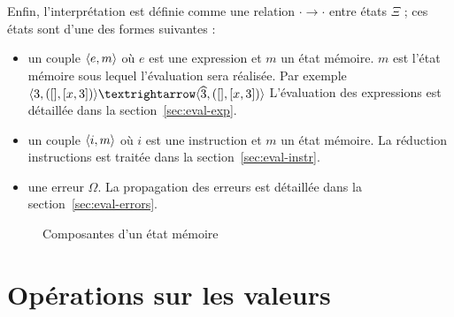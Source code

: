 Enfin, l'interprétation est définie comme une relation $\cdot → \cdot$ entre
états $Ξ$ ; ces états sont d'une des formes suivantes :

\begin{itemize}
\item
  un couple $\msi{m}{e}$ où $e$ est une expression et $m$ un état
  mémoire. $m$ est l'état mémoire sous lequel l'évaluation sera
  réalisée. Par exemple $\mm{([], [x,3])}{3}{([], [x,3])}{\widehat{3}}$
  L'évaluation des expressions est détaillée dans la
  section~\ref{sec:eval-exp}.
\item
  un couple $\msi{m}{i}$ où $i$ est une instruction et $m$ un état
  mémoire. La réduction instructions est traitée dans la
  section~\ref{sec:eval-instr}.
\item
  une erreur $Ω$. La propagation des erreurs est détaillée dans la
  section~\ref{sec:eval-errors}.
\end{itemize}

\begin{figure}%




  \caption{Composantes d'un état mémoire}
  \label{fig:interp}
\end{figure}%

\section{Opérations sur les valeurs}
\label{sec:sem-ops}

